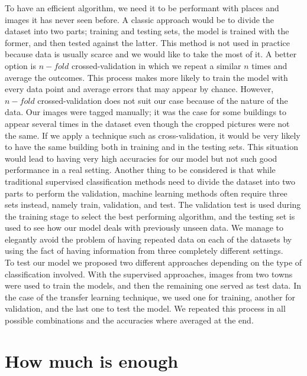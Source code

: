 To have an efficient algorithm, we need it to be performant with places and images it has never seen before. A classic approach would be to divide the dataset into two parts; training and testing sets, the model is trained with the former, and then tested against the latter. This method is not used in practice because data is usually scarce and we would like to take the most of it. A better option is $n-fold$ crossed-validation in which we repeat a similar $n$ times and average the outcomes. This process makes more likely to train the model with every data point and average errors that may appear by chance. However, $n-fold$ crossed-validation does not suit our case because of the nature of the data. Our images were tagged manually; it was the case for some buildings to appear several times in the dataset even though the cropped pictures were not the same. If we apply a technique such as cross-validation, it would be very likely to have the same building both in training and in the testing sets. This situation would lead to having very high accuracies for our model but not such good performance in a real setting. Another thing to be considered is that while traditional supervised classification methods need to divide the dataset into two parts to perform the validation, machine learning methods often require three sets instead, namely train, validation,  and test. The validation test is used during the training stage to select the best performing algorithm, and the testing set is used to see how our model deals with previously unseen data. We manage to elegantly avoid the problem of having repeated data on each of the datasets by using the fact of having information from three completely different settings.\\

To test our model we proposed two different approaches depending on the type of classification involved. With the supervised approaches, images from two towns were used to train the models, and then the remaining one served as test data. In the case of the transfer learning technique, we used one for training, another for validation, and the last one to test the model. We repeated this process in all possible combinations and the accuracies where averaged at the end.\\


\section{How much is enough}


